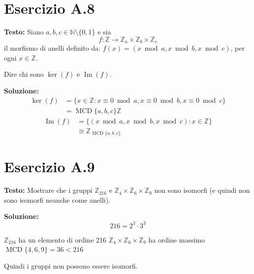\documentclass[a4paper,12pt]{article}
\newcommand{\esercizio}[2]{%
    \textbf{Testo:}
    #1
    
    \vspace{1.5em}
    
    \textbf{Soluzione:}
    #2
}
\begin{document}
\section*{Esercizio A.8}
\esercizio{%
    Siano $a,b,c \in \mathbb{N}\setminus\{0,1\}$ e sia
    \[
        f : \mathbb{Z} \to \mathbb{Z}_a \times \mathbb{Z}_b \times\mathbb{Z}_c
    \]
    il morfismo di anelli definito da: $f(x) = (x \bmod a, x \bmod b, x \bmod c)$, per ogni $x \in \mathbb{Z}$.

    Dire chi sono $\ker(f)$ e $\operatorname{Im}(f)$.
}{%
    \begin{align*}
        \ker(f) & = \{x \in \mathbb{Z}: x \equiv 0 \bmod{a}, x \equiv 0 \bmod{b}, x \equiv 0 \bmod{c}\} \\
                & = \operatorname{MCD}\{a,b,c\}\mathbb{Z}
    \end{align*}
    \begin{align*}
        \operatorname{Im}(f) & = \{(x \bmod a, x \bmod b, x \bmod c): x \in \mathbb{Z}\} \\
                             & \cong \mathbb{Z}_{\operatorname{MCD}\{a,b,c\}}
    \end{align*}
}

\section*{Esercizio A.9}
\esercizio{%
    Mostrare che i gruppi $\mathbb{Z}_{216}$ e $\mathbb{Z}_4 \times \mathbb{Z}_6 \times \mathbb{Z}_9$ non sono isomorfi (e quindi non sono isomorfi neanche come anelli).
}{%
    \[
        216 = 2^3 \cdot 3^3
    \]

    $\mathbb{Z}_{216}$ ha un elemento di ordine 216
    $\mathbb{Z}_4 \times \mathbb{Z}_6 \times \mathbb{Z}_9$ ha ordine massimo
    $\operatorname{MCD}\{4,6,9\} = 36 < 216$

    Quindi i gruppi non possono essere isomorfi.
}

\newpage
\end{document}
